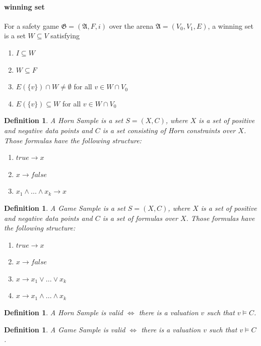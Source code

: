 \documentclass[10pt,a4paper]{article}
\theoremstyle{plain}
\newtheorem{mydef}[thm]{Definition}
\theoremstyle{definition}
\begin{document}
\paragraph*{winning set} For a safety game $\mathfrak{G} = (\mathfrak{A}, F, i)$ over the arena $\mathfrak{A} = (V_{0}, V_{1}, E)$, a winning set is a set $W \subseteq V$ satisfying
\begin{enumerate}
\item $I \subseteq W$
\item $W \subseteq F$
\item $E(\{v\}) \cap W \neq \emptyset$ for all $v \in W \cap V_{0}$
\item $E(\{v\}) \subseteq W$ for all $v \in W \cap V_{0}$
\end{enumerate}
\begin{mydef}
A \emph{Horn Sample} is a set $S = (X,C)$, where $X$ is a set of positive and negative data points and $C$ is a set consisting of Horn constraints over $X$. Those formulas have the following structure:
\begin{enumerate}
\item $true \to x$
\item $x \to false$
\item $x_1 \wedge...\wedge x_k \to x $
\end{enumerate}
\end{mydef}
\begin{mydef}
A \emph{Game Sample} is a set $S = (X,C)$, where $X$ is a set of positive and negative data points and $C$ is a set of formulas over $X$. Those formulas have the following structure:
\begin{enumerate}
\item $true \to x$
\item $x \to false$
\item $x \to x_1 \vee  ... \vee x_k$
\item $x \to x_1 \wedge ... \wedge x_k$ 
\end{enumerate}
\end{mydef}

\begin{mydef}
A Horn Sample is \emph{valid} $\iff $ there is a valuation $v$ such that $v \vDash C$.
\end{mydef}
\begin{mydef}
A Game Sample is \emph{valid} $\iff $ there is a valuation $v$ such that $v \vDash C$.
\end{mydef}
\end{document}
